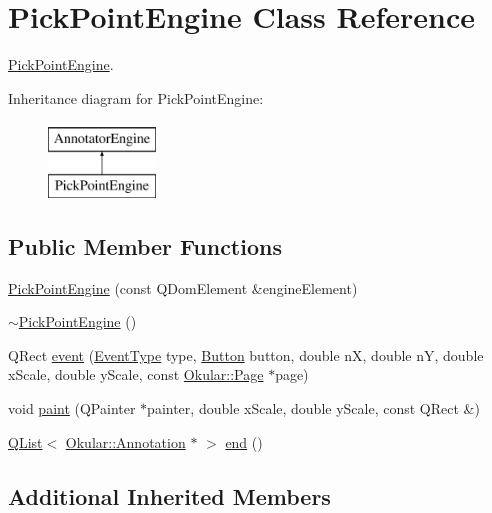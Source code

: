 \hypertarget{classPickPointEngine}{\section{Pick\+Point\+Engine Class Reference}
\label{classPickPointEngine}
}


\hyperlink{classPickPointEngine}{Pick\+Point\+Engine}.  


Inheritance diagram for Pick\+Point\+Engine\+:\begin{figure}[H]
\begin{center}
\leavevmode
\includegraphics[height=2.000000cm]{classPickPointEngine}
\end{center}
\end{figure}
\subsection*{Public Member Functions}
\begin{DoxyCompactItemize}
\item 
\hyperlink{classPickPointEngine_a645c9139ab72aaf37bf974a2a50f0276}{Pick\+Point\+Engine} (const Q\+Dom\+Element \&engine\+Element)
\item 
\hyperlink{classPickPointEngine_a1b09b40f537cd9653259bd37630f0198}{$\sim$\+Pick\+Point\+Engine} ()
\item 
Q\+Rect \hyperlink{classPickPointEngine_a7dd04c96b28fbf6dba26c5f277827ece}{event} (\hyperlink{classAnnotatorEngine_a00fb22eb4cb6eafb056f9066031db133}{Event\+Type} type, \hyperlink{classAnnotatorEngine_ac2e3b75e12bacbb6974d15dd53954567}{Button} button, double n\+X, double n\+Y, double x\+Scale, double y\+Scale, const \hyperlink{classOkular_1_1Page}{Okular\+::\+Page} $\ast$page)
\item 
void \hyperlink{classPickPointEngine_a1af9d4c401554caa10918985dbd7aae2}{paint} (Q\+Painter $\ast$painter, double x\+Scale, double y\+Scale, const Q\+Rect \&)
\item 
\hyperlink{classQList}{Q\+List}$<$ \hyperlink{classOkular_1_1Annotation}{Okular\+::\+Annotation} $\ast$ $>$ \hyperlink{classPickPointEngine_a4a3cc45d8861f30637b2aa5ee85cc6c3}{end} ()
\end{DoxyCompactItemize}
\subsection*{Additional Inherited Members}


